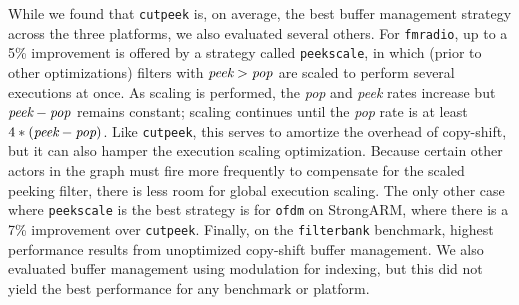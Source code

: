 While we found that {\tt cutpeek} is, on average, the best buffer
management strategy across the three platforms, we also evaluated
several others.  For {\tt fmradio}, up to a 5\% improvement is offered
by a strategy called {\tt peekscale}, in which (prior to other
optimizations) filters with $\mbox{\it peek}>\mbox{\it pop}$ are
scaled to perform several executions at once.  As scaling is
performed, the {\it pop} and {\it peek} rates increase but $\mbox{{\it
peek}} - \mbox{\it pop}$ remains constant; scaling continues until the
{\it pop} rate is at least $4*(\mbox{{\it peek}} - \mbox{{\it pop}})$.
Like {\tt cutpeek}, this serves to amortize the overhead of
copy-shift, but it can also hamper the execution scaling optimization.
Because certain other actors in the graph must fire more frequently to
compensate for the scaled peeking filter, there is less room for
global execution scaling.  The only other case where {\tt peekscale}
is the best strategy is for {\tt ofdm} on StrongARM, where there is a
7\% improvement over {\tt cutpeek}.  Finally, on the {\tt filterbank}
benchmark, highest performance results from unoptimized copy-shift
buffer management.  We also evaluated buffer management using
modulation for indexing, but this did not yield the best performance
for any benchmark or platform.
